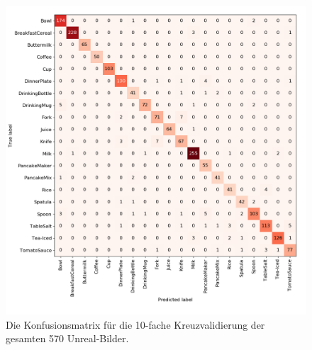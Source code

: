 \begin{figure}
	\includegraphics[scale=.5]{img/chapter6/UnrealGTClass.png}
\caption[Konfusionsmatrix des gesamten Unreal-Bilder Datensatzes]{Die Konfusionsmatrix für die 10-fache Kreuzvalidierung der gesamten 570 Unreal-Bilder.}
\label{fig:UnrealGTClass_confMatrix}
\end{figure}

